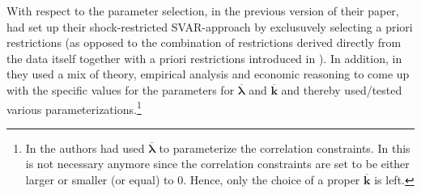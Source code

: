 \documentclass[a4paper,11pt,listof=nochaptergap,oneside,pointednumbers,bibtotoc,bigheadings,liststotoc,hidelinks]{scrbook}
\theoremstyle{mysatz}
\theoremstyle{mydefinition}
\theoremstyle{mytheorem}
\theoremstyle{mybemerkung}
\newcommand{\vect}[1]{\boldsymbol{\mathbf{#1}}}
\begin{document}
With respect to the parameter selection, in the previous version of their paper, \citet{ludvigsonetal:18} had set up their shock-restricted SVAR-approach by exclusuvely selecting a priori restrictions (as opposed to the combination of restrictions derived directly from the data itself together with a priori restrictions introduced in \citealp{ludvigsonetal:19}). In addition, in \citet{ludvigsonetal:18} they used a mix of theory, empirical analysis and economic reasoning to come up with the specific values for the parameters for $\overline{\vect{\lambda}}$ and $\overline{\vect{k}}$ and thereby used/tested various parameterizations.\footnote{In \citet{ludvigsonetal:18} the authors had used $\overline{\vect{\lambda}}$ to parameterize the correlation constraints. In \citet{ludvigsonetal:19} this is not necessary anymore since the correlation constraints are set to be either larger or smaller (or equal) to $0$. Hence, only the choice of a proper $\overline{\vect{k}}$ is left.} 
\end{document}
